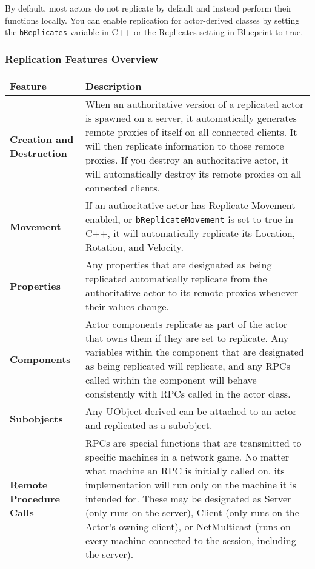 \documentclass[
  letterpaper,
  DIV=11,
  numbers=noendperiod]{scrartcl}
\begin{document}
By default, most actors do not replicate by default and instead perform
their functions locally. You can enable replication for actor-derived
classes by setting the \texttt{bReplicates} variable in C++ or the
Replicates setting in Blueprint to true.

\subsubsection{Replication Features
Overview}\label{replication-features-overview}

\begin{longtable}[]{@{}
  >{\raggedright\arraybackslash}p{}
  >{\raggedright\arraybackslash}p{}@{}}
\toprule\noalign{}
\begin{minipage}[b]{\linewidth}\raggedright
Feature
\end{minipage} & \begin{minipage}[b]{\linewidth}\raggedright
Description
\end{minipage} \\
\midrule\noalign{}
\endhead
\bottomrule\noalign{}
\endlastfoot
\textbf{Creation and Destruction} & When an authoritative version of a
replicated actor is spawned on a server, it automatically generates
remote proxies of itself on all connected clients. It will then
replicate information to those remote proxies. If you destroy an
authoritative actor, it will automatically destroy its remote proxies on
all connected clients. \\
\textbf{Movement} & If an authoritative actor has Replicate Movement
enabled, or \texttt{bReplicateMovement} is set to true in C++, it will
automatically replicate its Location, Rotation, and Velocity. \\
\textbf{Properties} & Any properties that are designated as being
replicated automatically replicate from the authoritative actor to its
remote proxies whenever their values change. \\
\textbf{Components} & Actor components replicate as part of the actor
that owns them if they are set to replicate. Any variables within the
component that are designated as being replicated will replicate, and
any RPCs called within the component will behave consistently with RPCs
called in the actor class. \\
\textbf{Subobjects} & Any UObject-derived can be attached to an actor
and replicated as a subobject. \\
\textbf{Remote Procedure Calls} & RPCs are special functions that are
transmitted to specific machines in a network game. No matter what
machine an RPC is initially called on, its implementation will run only
on the machine it is intended for. These may be designated as Server
(only runs on the server), Client (only runs on the Actor's owning
client), or NetMulticast (runs on every machine connected to the
session, including the server). \\
\end{longtable}
\end{document}
